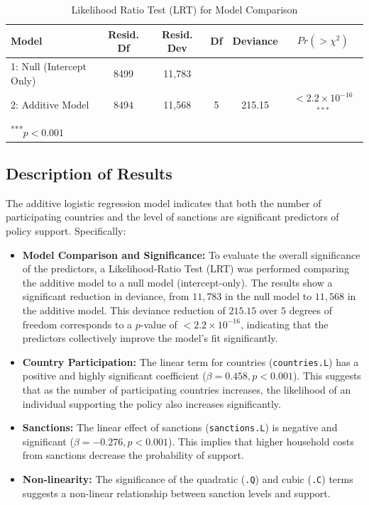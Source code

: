 \documentclass[12pt,letterpaper]{article}
\begin{document}
\begin{enumerate}
\begin{enumerate}
			
			
			\vspace{0.5cm}
			
			\begin{table}[ht]
				\centering
				\caption{Likelihood Ratio Test (LRT) for Model Comparison}
				\label{tab:lrt_result}
				\begin{tabular}{l c c c c c}
					\hline \hline
					Model & Resid. Df & Resid. Dev & Df & Deviance & $Pr(>\chi^2)$ \\ 
					\hline
					1: Null (Intercept Only) & 8499 & 11,783 & & & \\
					2: Additive Model & 8494 & 11,568 & 5 & 215.15 & $< 2.2 \times 10^{-16}$ $^{***}$ \\
					\hline \hline
					\multicolumn{6}{l}{\textsuperscript{***}$p < 0.001$}
				\end{tabular}
			\end{table}
			
			
			\newpage
			
			\subsection*{Description of Results}
			
			The additive logistic regression model indicates that both the number of participating countries and the level of sanctions are significant predictors of policy support. Specifically:
			
			\begin{itemize}
				\item \textbf{Model Comparison and Significance:} To evaluate the overall significance of the predictors, a Likelihood-Ratio Test (LRT) was performed comparing the additive model to a null model (intercept-only). The results show a significant reduction in deviance, from $11,783$ in the null model to $11,568$ in the additive model. This deviance reduction of $215.15$ over $5$ degrees of freedom corresponds to a $p$-value of $< 2.2 \times 10^{-16}$, indicating that the predictors collectively improve the model's fit significantly.
				\item \textbf{Country Participation:} The linear term for countries (\texttt{countries.L}) has a positive and highly significant coefficient ($\beta = 0.458, p < 0.001$). This suggests that as the number of participating countries increases, the likelihood of an individual supporting the policy also increases significantly.
				\item \textbf{Sanctions:} The linear effect of sanctions (\texttt{sanctions.L}) is negative and significant ($\beta = -0.276, p < 0.001$). This implies that higher household costs from sanctions decrease the probability of support.
				\item \textbf{Non-linearity:} The significance of the quadratic (\texttt{.Q}) and cubic (\texttt{.C}) terms suggests a non-linear relationship between sanction levels and support.
			\end{itemize}
			

\end{enumerate}
\end{enumerate}
\end{document}
